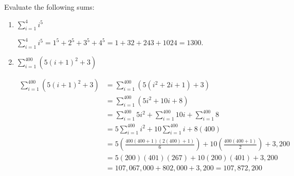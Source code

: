 \documentclass[handout, nooutcomes]{ximera}
\begin{document}
\begin{problem}
  Evaluate the following sums:
  \begin{enumerate}
  \item $\sum_{i=1}^{4} i^5 $
    \begin{freeResponse}
      $\sum_{i=1}^{4} i^5 = 1^5 + 2^5 + 3^5 + 4^5 = 1 + 32 + 243 +
      1024 = 1300$.
    \end{freeResponse}

  \item $\sum_{i=1}^{400} (5(i+1)^2 + 3) $
    \begin{freeResponse}
      \begin{align*}
        \sum_{i=1}^{400} (5(i+1)^2 + 3) 
        &= \sum_{i=1}^{400} (5(i^2 + 2i + 1) + 3) \\
        &= \sum_{i=1}^{400} (5i^2 + 10i + 8) \\
        &= \sum_{i=1}^{400} 5i^2 + \sum_{i=1}^{400} 10i + \sum_{i=1}^{400} 8  \\
        &= 5\sum_{i=1}^{400} i^2 + 10 \sum_{i=1}^{400} i + 8(400)  \\
        &= 5 \left( \frac{400(400+1)(2(400) + 1)}{6} \right) + 10 \left( \frac{400(400+1)}{2} \right) + 3,200  \\
        &= 5 (200)(401)(267) + 10(200)(401) + 3,200  \\
        &= 107,067,000 + 802,000 + 3,200 = 107,872,200
      \end{align*}
    \end{freeResponse}
  \end{enumerate}
\end{problem}
\end{document}

